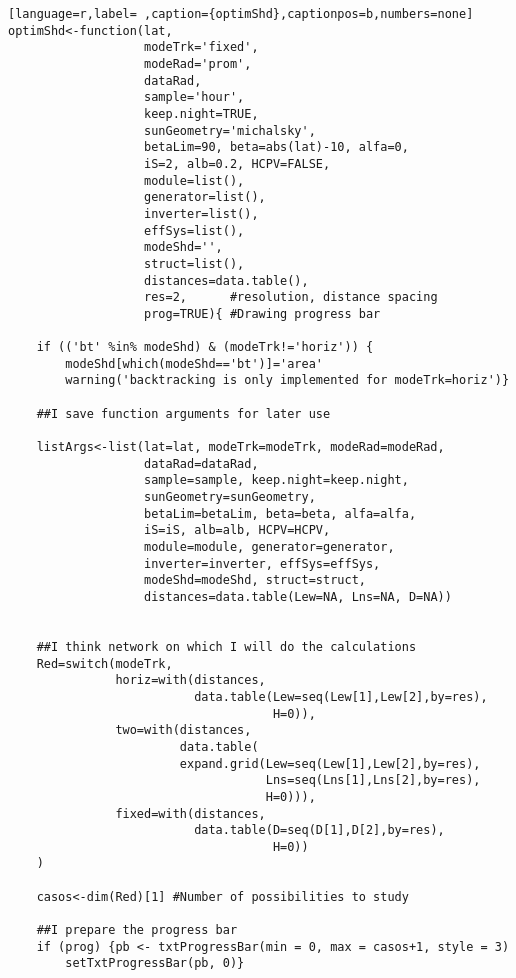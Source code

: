 \begin{lstlisting}[language=r,label= ,caption={optimShd},captionpos=b,numbers=none]
optimShd<-function(lat,
                   modeTrk='fixed', 
                   modeRad='prom', 
                   dataRad,
                   sample='hour',
                   keep.night=TRUE,
                   sunGeometry='michalsky',
                   betaLim=90, beta=abs(lat)-10, alfa=0,
                   iS=2, alb=0.2, HCPV=FALSE,
                   module=list(), 
                   generator=list(),
                   inverter=list(), 
                   effSys=list(), 
                   modeShd='',    
                   struct=list(), 
                   distances=data.table(),
                   res=2,      #resolution, distance spacing
                   prog=TRUE){ #Drawing progress bar

    if (('bt' %in% modeShd) & (modeTrk!='horiz')) {
        modeShd[which(modeShd=='bt')]='area'
        warning('backtracking is only implemented for modeTrk=horiz')}

    ##I save function arguments for later use

    listArgs<-list(lat=lat, modeTrk=modeTrk, modeRad=modeRad,
                   dataRad=dataRad,
                   sample=sample, keep.night=keep.night,
                   sunGeometry=sunGeometry,
                   betaLim=betaLim, beta=beta, alfa=alfa,
                   iS=iS, alb=alb, HCPV=HCPV,
                   module=module, generator=generator,
                   inverter=inverter, effSys=effSys,
                   modeShd=modeShd, struct=struct,
                   distances=data.table(Lew=NA, Lns=NA, D=NA))


    ##I think network on which I will do the calculations
    Red=switch(modeTrk,
               horiz=with(distances,
                          data.table(Lew=seq(Lew[1],Lew[2],by=res),
                                     H=0)),
               two=with(distances,
                        data.table(
                        expand.grid(Lew=seq(Lew[1],Lew[2],by=res),
                                    Lns=seq(Lns[1],Lns[2],by=res),
                                    H=0))),
               fixed=with(distances,
                          data.table(D=seq(D[1],D[2],by=res),
                                     H=0))
    )

    casos<-dim(Red)[1] #Number of possibilities to study

    ##I prepare the progress bar
    if (prog) {pb <- txtProgressBar(min = 0, max = casos+1, style = 3)
        setTxtProgressBar(pb, 0)}


\end{lstlisting}
